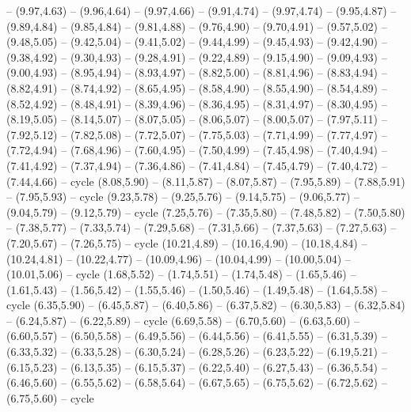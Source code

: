 {-- (9.97,4.63) -- (9.96,4.64) -- (9.97,4.66) -- (9.91,4.74) -- (9.97,4.74) -- (9.95,4.87) -- (9.89,4.84) -- (9.85,4.84) -- (9.81,4.88) -- (9.76,4.90) -- (9.70,4.91) -- (9.57,5.02) -- (9.48,5.05) -- (9.42,5.04) -- (9.41,5.02) -- (9.44,4.99) -- (9.45,4.93) -- (9.42,4.90) -- (9.38,4.92) -- (9.30,4.93) -- (9.28,4.91) -- (9.22,4.89) -- (9.15,4.90) -- (9.09,4.93) -- (9.00,4.93) -- (8.95,4.94) -- (8.93,4.97) -- (8.82,5.00) -- (8.81,4.96) -- (8.83,4.94) -- (8.82,4.91) -- (8.74,4.92) -- (8.65,4.95) -- (8.58,4.90) -- (8.55,4.90) -- (8.54,4.89) -- (8.52,4.92) -- (8.48,4.91) -- (8.39,4.96) -- (8.36,4.95) -- (8.31,4.97) -- (8.30,4.95) -- (8.19,5.05) -- (8.14,5.07) -- (8.07,5.05) -- (8.06,5.07) -- (8.00,5.07) -- (7.97,5.11) -- (7.92,5.12) -- (7.82,5.08) -- (7.72,5.07) -- (7.75,5.03) -- (7.71,4.99) -- (7.77,4.97) -- (7.72,4.94) -- (7.68,4.96) -- (7.60,4.95) -- (7.50,4.99) -- (7.45,4.98) -- (7.40,4.94) -- (7.41,4.92) -- (7.37,4.94) -- (7.36,4.86) -- (7.41,4.84) -- (7.45,4.79) -- (7.40,4.72) -- (7.44,4.66) -- cycle
  (8.08,5.90) -- (8.11,5.87) -- (8.07,5.87) -- (7.95,5.89) -- (7.88,5.91) -- (7.95,5.93) -- cycle
  (9.23,5.78) -- (9.25,5.76) -- (9.14,5.75) -- (9.06,5.77) -- (9.04,5.79) -- (9.12,5.79) -- cycle
  (7.25,5.76) -- (7.35,5.80) -- (7.48,5.82) -- (7.50,5.80) -- (7.38,5.77) -- (7.33,5.74) -- (7.29,5.68) -- (7.31,5.66) -- (7.37,5.63) -- (7.27,5.63) -- (7.20,5.67) -- (7.26,5.75) -- cycle
  (10.21,4.89) -- (10.16,4.90) -- (10.18,4.84) -- (10.24,4.81) -- (10.22,4.77) -- (10.09,4.96) -- (10.04,4.99) -- (10.00,5.04) -- (10.01,5.06) -- cycle
  (1.68,5.52) -- (1.74,5.51) -- (1.74,5.48) -- (1.65,5.46) -- (1.61,5.43) -- (1.56,5.42) -- (1.55,5.46) -- (1.50,5.46) -- (1.49,5.48) -- (1.64,5.58) -- cycle}
\expandafter\def\csname geo:gebiet:BHS\endcsname{
  }
\expandafter\def\csname geo:gebiet:FLK\endcsname{
  }
\expandafter\def\csname geo:gebiet:NOR\endcsname{
  (6.35,5.90) -- (6.45,5.87) -- (6.40,5.86) -- (6.37,5.82) -- (6.30,5.83) -- (6.32,5.84) -- (6.24,5.87) -- (6.22,5.89) -- cycle
  (6.69,5.58) -- (6.70,5.60) -- (6.63,5.60) -- (6.60,5.57) -- (6.50,5.58) -- (6.49,5.56) -- (6.44,5.56) -- (6.41,5.55) -- (6.31,5.39) -- (6.33,5.32) -- (6.33,5.28) -- (6.30,5.24) -- (6.28,5.26) -- (6.23,5.22) -- (6.19,5.21) -- (6.15,5.23) -- (6.13,5.35) -- (6.15,5.37) -- (6.22,5.40) -- (6.27,5.43) -- (6.36,5.54) -- (6.46,5.60) -- (6.55,5.62) -- (6.58,5.64) -- (6.67,5.65) -- (6.75,5.62) -- (6.72,5.62) -- (6.75,5.60) -- cycle}
